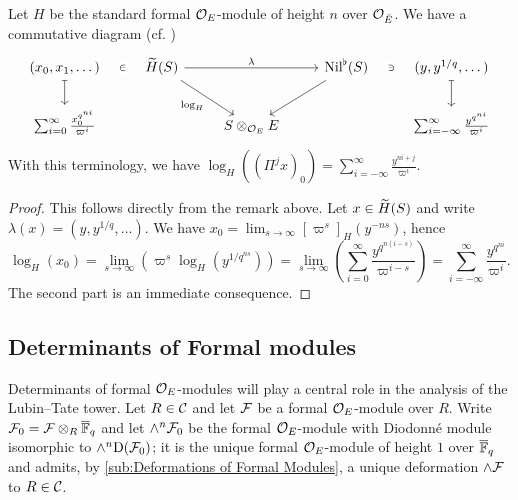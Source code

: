 \documentclass[../main.tex]{subfiles}
\begin{document}
\begin{lem}\label{lem:LogInTermsOfNil}
  Let $H$ be the standard formal $\cO_E$-module of height $n$ over $\cO_{\br
  E}$. We have a commutative diagram (cf. \cite[Lemma
  2.6.1]{BoyarchenkoWeinstein2011MaxVar})
  \begin{equation*}
  \begin{tikzcd}[ampersand replacement=\&]
  	{(x_0, x_1, \dots)} \& {\Tilde H(S)} \&\& {\Nil^\flat(S)} \& {(y,y^{1/q}, \dots)} \\
  	{\sum_{i=0}^\infty \frac{x_0^{q^{ni}}}{\varpi^i}} \&\& {S\otimes_{\cO_E}E} \&\& {\sum_{i = -\infty}^\infty\frac{y^{q^{ni}}}{\varpi^i}}
  	\arrow["\in"{description}, draw=none, from=1-1, to=1-2]
  	\arrow[maps to, from=1-1, to=2-1]
  	\arrow["\lambda", from=1-2, to=1-4]
  	\arrow["{\log_H}"', from=1-2, to=2-3]
  	\arrow[from=1-4, to=2-3]
  	\arrow["\ni"{description}, draw=none, from=1-5, to=1-4]
  	\arrow[maps to, from=1-5, to=2-5]
  \end{tikzcd}
  \end{equation*}
  With this terminology, we have $\log_H((\Pi^j x)_0) = \sum_{i = -\infty}^\infty
  \frac{ y^{ni + j}}{\varpi^i}$. 
\begin{proof}
  This follows directly from the remark above. Let $x \in \Tilde H(S)$ and write
  $\lambda(x) = (y, y^{1/q}, \dots)$. We have $x_0 = \lim_{s \to \infty}
  [\varpi^s]_H(y^{-ns})$, hence
  \begin{equation*}
    \log_H(x_0) = \lim_{s \to \infty}\left( \varpi^s \log_H(y^{1/q^{ns}})\right) = 
    \lim_{s \to \infty}\left( \sum_{i=0}^\infty
    \frac{y^{q^{n(i-s)}}}{\varpi^{i-s}}\right) = \sum_{i=-\infty}^\infty
    \frac{y^{q^{ni}}}{\varpi^i}.
  \end{equation*}
  The second part is an immediate consequence.
\end{proof}
\end{lem}




\subsection{Determinants of Formal modules} %
\label{sub:Determinants of Formal modules}
Determinants of formal $\cO_E$-modules will play a central role in the analysis
of the Lubin--Tate tower. Let $R \in \cC$ and let $\cF$ be a formal $\cO_E$-module
over $R$. Write $\cF_0 = \cF \otimes_R \Fqbar$ and let $\wedge^n \cF_0$ be the
formal $\cO_E$-module with Diodonn\'e module isomorphic to $\wedge^n \Dio(\cF_0)$;
it is the unique formal $\cO_E$-module of height $1$ over $\Fqbar$ and admits,
by \ref{sub:Deformations of Formal Modules}, a unique deformation 
$\wedge \cF$ to $R \in \cC$. 
\end{document}
